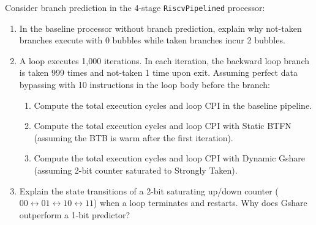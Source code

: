 \begin{problem}
Consider branch prediction in the 4-stage \texttt{RiscvPipelined} processor:
\begin{enumerate}
    \item In the baseline processor without branch prediction, explain why not-taken branches execute with 0 bubbles while taken branches incur 2 bubbles.
    \item A loop executes 1,000 iterations. In each iteration, the backward loop branch is taken 999 times and not-taken 1 time upon exit. Assuming perfect data bypassing with 10 instructions in the loop body before the branch:
    \begin{enumerate}
        \item Compute the total execution cycles and loop CPI in the baseline pipeline.
        \item Compute the total execution cycles and loop CPI with Static BTFN (assuming the BTB is warm after the first iteration).
        \item Compute the total execution cycles and loop CPI with Dynamic Gshare (assuming 2-bit counter saturated to Strongly Taken).
    \end{enumerate}
    \item Explain the state transitions of a 2-bit saturating up/down counter ($00 \leftrightarrow 01 \leftrightarrow 10 \leftrightarrow 11$) when a loop terminates and restarts. Why does Gshare outperform a 1-bit predictor?
\end{enumerate}


\end{problem}

